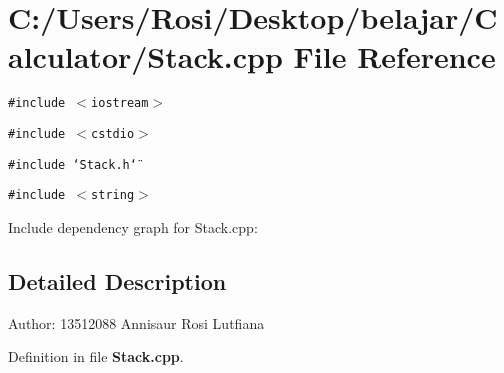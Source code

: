 \section{C:/Users/Rosi/Desktop/belajar/Calculator/Stack.cpp File Reference}
\label{_stack_8cpp}
{\tt \#include $<$iostream$>$}\par
{\tt \#include $<$cstdio$>$}\par
{\tt \#include \char`\"{}Stack.h\char`\"{}}\par
{\tt \#include $<$string$>$}\par


Include dependency graph for Stack.cpp:

\subsection{Detailed Description}
\begin{Desc}
\item[Author:]13512088 Annisaur Rosi Lutfiana \end{Desc}


Definition in file {\bf Stack.cpp}.
